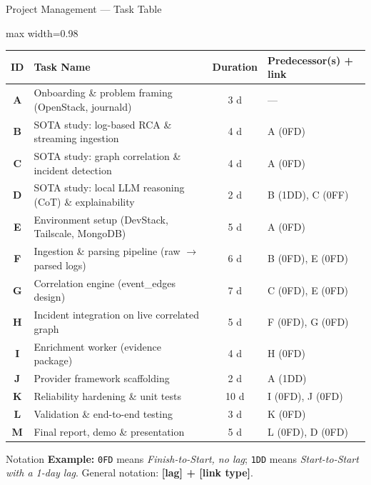 \documentclass{beamer}
\begin{document}
\begin{frame}{Project Management --- Task Table}
    
    \scriptsize
    \renewcommand{\arraystretch}{1.1}
    \begin{adjustbox}{max width=0.98\textwidth}
    \begin{tabular}{|c|p{5.6cm}|c|p{4.8cm}|}
        \hline
        \textbf{ID} & \textbf{Task Name} & \textbf{Duration} & \textbf{Predecessor(s) + link} \\ \hline
        \textbf{A} & Onboarding \& problem framing (OpenStack, journald) & 3 d & --- \\ \hline
        \textbf{B} & SOTA study: log-based RCA \& streaming ingestion & 4 d & A (0FD) \\ \hline
        \textbf{C} & SOTA study: graph correlation \& incident detection & 4 d & A (0FD) \\ \hline
        \textbf{D} & SOTA study: local LLM reasoning (CoT) \& explainability & 2 d & B (1DD), C (0FF) \\ \hline
        \textbf{E} & Environment setup (DevStack, Tailscale, MongoDB) & 5 d & A (0FD) \\ \hline
        \textbf{F} & Ingestion \& parsing pipeline (raw $\to$ parsed logs) & 6 d & B (0FD), E (0FD) \\ \hline
        \textbf{G} & Correlation engine (event\_edges design) & 7 d & C (0FD), E (0FD) \\ \hline
        \textbf{H} & Incident integration on live correlated graph & 5 d & F (0FD), G (0FD) \\ \hline
        \textbf{I} & Enrichment worker (evidence package) & 4 d & H (0FD) \\ \hline
        \textbf{J} & Provider framework scaffolding & 2 d & A (1DD) \\ \hline
        \textbf{K} & Reliability hardening \& unit tests & 10 d & I (0FD), J (0FD) \\ \hline
        \textbf{L} & Validation \& end-to-end testing & 3 d & K (0FD) \\ \hline
        \textbf{M} & Final report, demo \& presentation & 5 d & L (0FD), D (0FD) \\ \hline
    \end{tabular}
    \end{adjustbox}
    \vspace{0.15cm}
    \tiny
    \begin{block}{Notation}
        \textbf{Example:} \texttt{0FD} means \emph{Finish-to-Start, no lag}; \texttt{1DD} means \emph{Start-to-Start with a 1-day lag}.
        General notation: \textbf{[lag] + [link type]}.
    \end{block}
\end{frame}
\end{document}
